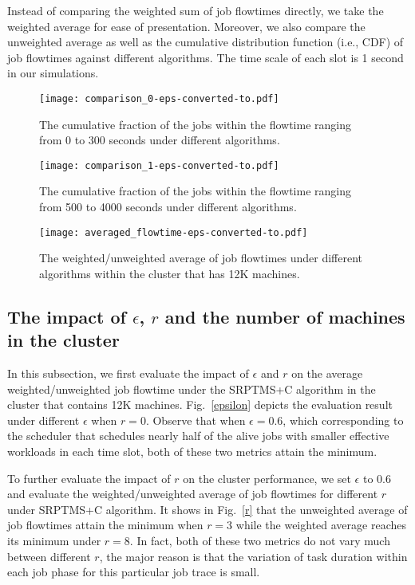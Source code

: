 \documentclass[10pt,conference,compsocconf,letterpaper]{IEEEtran}
\begin{document}
Instead of comparing the weighted sum of job flowtimes directly, we take the weighted average for ease of presentation. Moreover, we also compare the unweighted average as well as the cumulative distribution function (i.e., CDF) of job flowtimes against different algorithms. The time scale of each slot is 1 second in our simulations.

\begin{figure*}
\centering
\begin{minipage}{.32\textwidth}
\centering
\texttt{[image: comparison\_0-eps-converted-to.pdf]}
\caption{The cumulative fraction of the jobs within
the  flowtime ranging from 0 to 300 seconds under different algorithms.}
\label{big_cmf}
\end{minipage}\hfill
\begin{minipage}{.32\textwidth}
\centering
\texttt{[image: comparison\_1-eps-converted-to.pdf]}
\caption{The cumulative fraction of the jobs within
the flowtime ranging from 500 to 4000 seconds under different algorithms.}
\label{small_cmf}
\end{minipage}\hfill
\begin{minipage}{.32\textwidth}
\centering
\texttt{[image: averaged\_flowtime-eps-converted-to.pdf]}
\caption{The weighted/unweighted average of job flowtimes under different algorithms within the cluster that has 12K machines.}
\label{averagedflowtime}
\end{minipage}
\vspace{-1.0em}
\end{figure*}


\subsection{The impact of $\epsilon$, $r$ and the number of machines in the cluster}
In this subsection, we first evaluate the impact of $\epsilon$ and $r$ on the average  weighted/unweighted job flowtime under the SRPTMS+C algorithm in the cluster that
contains 12K machines.  Fig.~\ref{epsilon} depicts the evaluation result under different $\epsilon$ when $r=0$. Observe that when $\epsilon = 0.6$, which corresponding to the scheduler that schedules nearly half of the alive jobs with smaller effective workloads in each time slot, both of these two metrics attain the minimum. 

To further evaluate the impact of $r$ on the cluster performance, we set $\epsilon$ to 0.6 and evaluate the weighted/unweighted average of job flowtimes for different $r$ under SRPTMS+C algorithm. It shows in Fig.~\ref{r} that the unweighted average of job flowtimes attain the minimum when $r=3$ while the weighted average reaches its minimum under $r=8$.
In fact, both of these two metrics do not vary much between different $r$, the major reason is that the variation of task duration within each job phase for this particular job trace is small.
\end{document}
